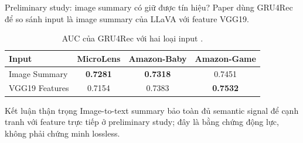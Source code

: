 \begin{frame}{Preliminary study: image summary có giữ được tín hiệu?}
  \small Paper dùng GRU4Rec để so sánh input là image summary của LLaVA với feature VGG19.
  \begin{table}\centering
    \begin{tabular}{lccc}\toprule
      Input & MicroLens & Amazon-Baby & Amazon-Game\\\midrule
      Image Summary & \textbf{0.7281} & \textbf{0.7318} & 0.7451\\
      VGG19 Features & 0.7154 & 0.7383 & \textbf{0.7532}\\\bottomrule
    \end{tabular}
    \caption{AUC của GRU4Rec với hai loại input \cite{ye2025mllmmsr}.}
  \end{table}
  \vspace{0.2cm}\begin{block}{Kết luận thận trọng}
    Image-to-text summary bảo toàn đủ semantic signal để cạnh tranh với feature trực tiếp ở preliminary study; đây là bằng chứng động lực, không phải chứng minh lossless.
  \end{block}
\end{frame}
